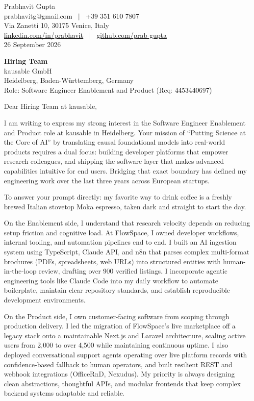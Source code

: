 \documentclass[11pt,a4paper]{article}
\begin{document}
Prabhavit Gupta\\
prabhavitg@gmail.com ~$\vert$~ +39 351 610 7807\\
Via Zanetti 10, 30175 Venice, Italy\\
\href{https://www.linkedin.com/in/prabhavit/}{linkedin.com/in/prabhavit} ~$\vert$~ \href{https://github.com/prab-gupta}{github.com/prab-gupta}\\
26 September 2026

\textbf{Hiring Team}\\
kausable GmbH\\
Heidelberg, Baden-W\"urttemberg, Germany\\
Role: Software Engineer Enablement and Product (Req: 4453440697)

Dear Hiring Team at kausable,

I am writing to express my strong interest in the Software Engineer Enablement and Product role at kausable in Heidelberg. Your mission of ``Putting Science at the Core of AI'' by translating causal foundational models into real-world products requires a dual focus: building developer platforms that empower research colleagues, and shipping the software layer that makes advanced capabilities intuitive for end users. Bridging that exact boundary has defined my engineering work over the last three years across European startups.

To answer your prompt directly: my favorite way to drink coffee is a freshly brewed Italian stovetop Moka espresso, taken dark and straight to start the day.

On the Enablement side, I understand that research velocity depends on reducing setup friction and cognitive load. At FlowSpace, I owned developer workflows, internal tooling, and automation pipelines end to end. I built an AI ingestion system using TypeScript, Claude API, and n8n that parses complex multi-format brochures (PDFs, spreadsheets, web URLs) into structured entities with human-in-the-loop review, drafting over 900 verified listings. I incorporate agentic engineering tools like Claude Code into my daily workflow to automate boilerplate, maintain clear repository standards, and establish reproducible development environments.

On the Product side, I own customer-facing software from scoping through production delivery. I led the migration of FlowSpace's live marketplace off a legacy stack onto a maintainable Next.js and Laravel architecture, scaling active users from 2,000 to over 4,500 while maintaining continuous uptime. I also deployed conversational support agents operating over live platform records with confidence-based fallback to human operators, and built resilient REST and webhook integrations (OfficeRnD, Nexudus). My priority is always designing clean abstractions, thoughtful APIs, and modular frontends that keep complex backend systems adaptable and reliable.
\end{document}
